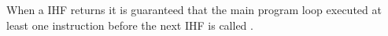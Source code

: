 \documentclass[a4paper, oneside, final]{memoir}
\begin{document}
When a IHF returns it is guaranteed that the main program loop executed at least
one instruction before the next IHF is called \cite[Section 4.7 page 14]{atmel8p}.





\end{document}
